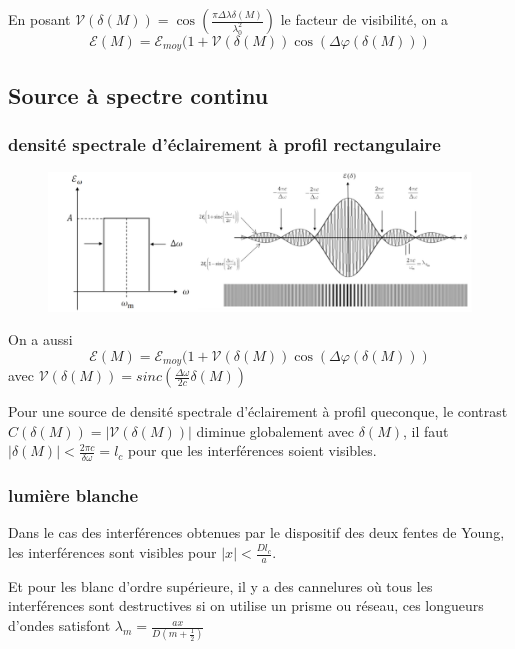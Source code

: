 \documentclass[a4paper,12pt]{book}
\begin{document}
En posant $\mathcal{V}(\delta(M))=\cos\left(\frac{\pi\Delta\lambda\delta(M)}{\lambda_0^2}\right)$ le facteur de visibilité, on a 
$$\boxed{\mathcal{E}(M)=\mathcal{E}_{moy}(1+\mathcal{V}(\delta(M))\cos(\Delta\varphi(\delta(M)))}$$
\subsection{Source à spectre continu}
\subsubsection{densité spectrale d'éclairement à profil rectangulaire}

\begin{figure}[h]
    \begin{center}
    \includegraphics[scale=0.4]{tr142.png}
    \end{center}
\end{figure}
On a aussi 
$$\mathcal{E}(M)=\mathcal{E}_{moy}(1+\mathcal{V}(\delta(M))\cos(\Delta\varphi(\delta(M)))$$
avec 
$\mathcal{V}(\delta(M))=sinc\left(\frac{\Delta\omega}{2c}\delta(M)\right)$

Pour une source de densité spectrale d'éclairement à profil queconque, 
le contrast $C(\delta(M))=|\mathcal{V}(\delta(M))|$ diminue globalement avec $\delta(M)$, il faut $|\delta(M)|<\frac{2\pi c}{\delta\omega}=l_c$ pour que 
les interférences soient visibles. 
\subsubsection{lumière blanche}
Dans le cas des interférences obtenues par le dispositif des deux fentes de Young, les interférences sont visibles pour 
$|x|<\frac{Dl_c}{a}$. 

Et pour les blanc d'ordre supérieure, il y a des cannelures où tous les interférences sont destructives si on utilise un prisme ou réseau,  
ces longueurs d'ondes satisfont $\lambda_m=\frac{ax}{D(m+\frac{1}{2})}$
\end{document}
